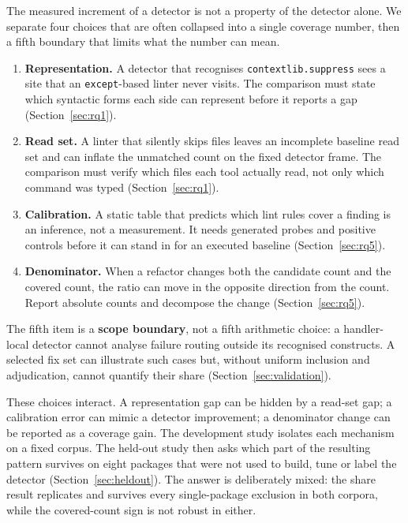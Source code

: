 \documentclass[10pt,a4paper]{article}
\begin{document}
The measured increment of a detector is not a property of the detector alone.
We separate four choices that are often collapsed into a single coverage number,
then a fifth boundary that limits what the number can mean.
\begin{enumerate}[label=\textbf{C\arabic*},nosep,leftmargin=*]
\item \textbf{Representation.} A detector that recognises
  \texttt{contextlib.suppress} sees a site that an \texttt{except}-based
  linter never visits. The comparison must state which syntactic forms each
  side can represent before it reports a gap
  (Section~\ref{sec:rq1}).
\item \textbf{Read set.} A linter that silently skips files leaves an incomplete baseline read set
  and can inflate the unmatched count on the fixed detector frame. The comparison must
  verify which files each tool actually read, not only which command was
  typed (Section~\ref{sec:rq1}).
\item \textbf{Calibration.} A static table that predicts which lint rules
  cover a finding is an inference, not a measurement. It needs generated
  probes and positive controls before it can stand in for an executed
  baseline (Section~\ref{sec:rq5}).
\item \textbf{Denominator.} When a refactor changes both the candidate count
  and the covered count, the ratio can move in the opposite direction from
  the count. Report absolute counts and decompose the change
  (Section~\ref{sec:rq5}).
\end{enumerate}
The fifth item is a \textbf{scope boundary}, not a fifth arithmetic choice:
a handler-local detector cannot analyse failure routing outside its
recognised constructs. A selected fix set can illustrate such cases but,
without uniform inclusion and adjudication, cannot quantify their share (Section~\ref{sec:validation}).

These choices interact. A representation gap can be hidden by a read-set
gap; a calibration error can mimic a detector improvement; a denominator
change can be reported as a coverage gain. The development study isolates
each mechanism on a fixed corpus. The held-out study then asks which part of
the resulting pattern survives on eight packages that were not used to build,
tune or label the detector (Section~\ref{sec:heldout}). The answer is
deliberately mixed: the share result replicates and survives every
single-package exclusion in both corpora, while the covered-count sign is
not robust in either.
\end{document}
